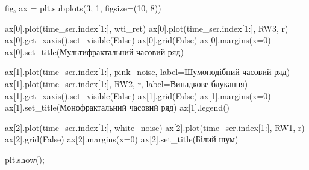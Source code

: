 \documentclass[
  letterpaper,
]{report}
\newenvironment{Shaded}{\begin{snugshade}}{\end{snugshade}}
\newcommand{\DecValTok}[1]{\textcolor[rgb]{0.68,0.00,0.00}{#1}}
\newcommand{\NormalTok}[1]{\textcolor[rgb]{0.00,0.23,0.31}{#1}}
\newcommand{\OperatorTok}[1]{\textcolor[rgb]{0.37,0.37,0.37}{#1}}
\newcommand{\StringTok}[1]{\textcolor[rgb]{0.13,0.47,0.30}{#1}}
\newcommand{\VariableTok}[1]{\textcolor[rgb]{0.07,0.07,0.07}{#1}}
\begin{document}
\begin{Shaded}
\begin{Highlighting}[]
\NormalTok{fig, ax }\OperatorTok{=}\NormalTok{ plt.subplots(}\DecValTok{3}\NormalTok{, }\DecValTok{1}\NormalTok{, figsize}\OperatorTok{=}\NormalTok{(}\DecValTok{10}\NormalTok{, }\DecValTok{8}\NormalTok{))}

\NormalTok{ax[}\DecValTok{0}\NormalTok{].plot(time\_ser.index[}\DecValTok{1}\NormalTok{:], wti\_ret)}
\NormalTok{ax[}\DecValTok{0}\NormalTok{].plot(time\_ser.index[}\DecValTok{1}\NormalTok{:], RW3, }\StringTok{\textquotesingle{}r\textquotesingle{}}\NormalTok{)}
\NormalTok{ax[}\DecValTok{0}\NormalTok{].get\_xaxis().set\_visible(}\VariableTok{False}\NormalTok{)}
\NormalTok{ax[}\DecValTok{0}\NormalTok{].grid(}\VariableTok{False}\NormalTok{)}
\NormalTok{ax[}\DecValTok{0}\NormalTok{].margins(x}\OperatorTok{=}\DecValTok{0}\NormalTok{)}
\NormalTok{ax[}\DecValTok{0}\NormalTok{].set\_title(}\StringTok{\textquotesingle{}Мультифрактальний часовий ряд\textquotesingle{}}\NormalTok{)}

\NormalTok{ax[}\DecValTok{1}\NormalTok{].plot(time\_ser.index[}\DecValTok{1}\NormalTok{:], pink\_noise, label}\OperatorTok{=}\StringTok{\textquotesingle{}Шумоподібний часовий ряд\textquotesingle{}}\NormalTok{)}
\NormalTok{ax[}\DecValTok{1}\NormalTok{].plot(time\_ser.index[}\DecValTok{1}\NormalTok{:], RW2, }\StringTok{\textquotesingle{}r\textquotesingle{}}\NormalTok{, label}\OperatorTok{=}\StringTok{\textquotesingle{}Випадкове блукання\textquotesingle{}}\NormalTok{)}
\NormalTok{ax[}\DecValTok{1}\NormalTok{].get\_xaxis().set\_visible(}\VariableTok{False}\NormalTok{)}
\NormalTok{ax[}\DecValTok{1}\NormalTok{].grid(}\VariableTok{False}\NormalTok{)}
\NormalTok{ax[}\DecValTok{1}\NormalTok{].margins(x}\OperatorTok{=}\DecValTok{0}\NormalTok{)}
\NormalTok{ax[}\DecValTok{1}\NormalTok{].set\_title(}\StringTok{\textquotesingle{}Монофрактальний часовий ряд\textquotesingle{}}\NormalTok{)}
\NormalTok{ax[}\DecValTok{1}\NormalTok{].legend()}

\NormalTok{ax[}\DecValTok{2}\NormalTok{].plot(time\_ser.index[}\DecValTok{1}\NormalTok{:], white\_noise)}
\NormalTok{ax[}\DecValTok{2}\NormalTok{].plot(time\_ser.index[}\DecValTok{1}\NormalTok{:], RW1, }\StringTok{\textquotesingle{}r\textquotesingle{}}\NormalTok{)}
\NormalTok{ax[}\DecValTok{2}\NormalTok{].grid(}\VariableTok{False}\NormalTok{)}
\NormalTok{ax[}\DecValTok{2}\NormalTok{].margins(x}\OperatorTok{=}\DecValTok{0}\NormalTok{)}
\NormalTok{ax[}\DecValTok{2}\NormalTok{].set\_title(}\StringTok{\textquotesingle{}Білий шум\textquotesingle{}}\NormalTok{)}

\NormalTok{plt.show()}\OperatorTok{;}
\end{Highlighting}
\end{Shaded}
\end{document}
